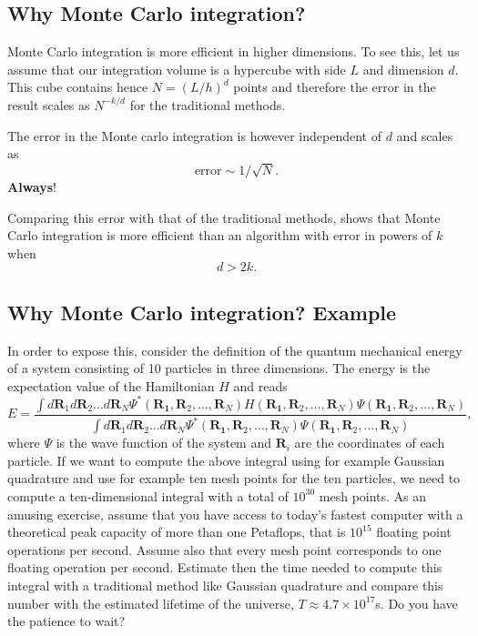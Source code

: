 \documentclass[%
oneside,                 %
final,                   %
10pt]{article}
\newenvironment{block_mdfboxadmon}[1][]{
\begin{block_mdfboxmdframed}[frametitle=#1]
}
{
\end{block_mdfboxmdframed}
}
\begin{document}
\subsection{Why Monte Carlo integration?}

\begin{block_mdfboxadmon}[]
Monte Carlo integration is more efficient in higher dimensions.
To see this, let us assume that our integration volume is a hypercube 
with side $L$ and dimension $d$. This cube contains hence 
$N=(L/h)^d$ points and therefore the error in the result scales as
$N^{-k/d}$ for the traditional methods. 

The error in the Monte carlo integration is 
however independent of $d$ and scales as 
\[
\mathrm{error}\sim 1/\sqrt{N}. 
\]
\textbf{Always}! 

Comparing this error with that of the traditional methods, shows that
Monte Carlo integration is more efficient than an  algorithm with error in powers of $k$
when 
\[
d>2k.
\]
\end{block_mdfboxadmon} %



\subsection{Why Monte Carlo integration? Example}

\begin{block_mdfboxadmon}[]
In order to expose this, consider the definition of the quantum mechanical energy
of a system consisting of 10 particles in three dimensions. The energy is the expectation value 
of the Hamiltonian $H$ and reads
\begin{equation*}
    E=\frac{\int d\mathbf{R}_1d\mathbf{R}_2\dots d\mathbf{R}_N
          \Psi^{\ast}(\mathbf{R_1},\mathbf{R}_2,\dots,\mathbf{R}_N)
           H(\mathbf{R_1},\mathbf{R}_2,\dots,\mathbf{R}_N)
           \Psi(\mathbf{R_1},\mathbf{R}_2,\dots,\mathbf{R}_N)}
         {\int d\mathbf{R}_1d\mathbf{R}_2\dots d\mathbf{R}_N
         \Psi^{\ast}(\mathbf{R_1},\mathbf{R}_2,\dots,\mathbf{R}_N)
         \Psi(\mathbf{R_1},\mathbf{R}_2,\dots,\mathbf{R}_N)},
 \end{equation*}
where $\Psi$ is the wave function of the system and $\mathbf{R}_i$ are the coordinates
of each particle. If we want to compute the above integral 
using for example Gaussian quadrature and use for example ten mesh
points for the ten particles, we need to compute a ten-dimensional integral with a total of $10^{30}$ mesh points.
As an amusing exercise, assume that you have access to today's fastest computer with a theoretical peak 
capacity of more than one Petaflops, that is $10^{15}$ floating point operations per second. Assume also that every mesh point
corresponds to one floating operation per second. Estimate then the time needed to compute this integral with
a traditional method like Gaussian quadrature and compare this number with the estimated lifetime of the
universe, $T\approx 4.7 \times 10^{17}$s. Do you have the patience to wait?
\end{block_mdfboxadmon} %
\end{document}
